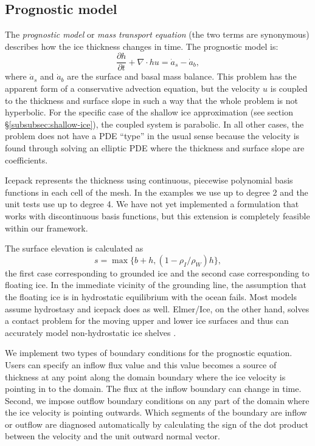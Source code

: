 \documentclass[journal abbreviation, manuscript]{copernicus}
\begin{document}
\subsection{Prognostic model}

The \emph{prognostic model} or \emph{mass transport equation} (the two terms are synonymous) describes how the ice thickness changes in time.
The prognostic model is:
\begin{equation}
    \frac{\partial h}{\partial t} + \nabla\cdot hu = \dot a_s - \dot a_b,
    \label{eq:prognostic-eqn}
\end{equation}
where $\dot a_s$ and $\dot a_b$ are the surface and basal mass balance.
This problem has the apparent form of a conservative advection equation, but the velocity $u$ is coupled to the thickness and surface slope in such a way that the whole problem is not hyperbolic.
For the specific case of the shallow ice approximation (see section \S\ref{subsubsec:shallow-ice}), the coupled system is parabolic.
In all other cases, the problem does not have a PDE ``type'' in the usual sense because the velocity is found through solving an elliptic PDE where the thickness and surface slope are coefficients.

Icepack represents the thickness using continuous, piecewise polynomial basis functions in each cell of the mesh.
In the examples we use up to degree 2 and the unit tests use up to degree 4.
We have not yet implemented a formulation that works with discontinuous basis functions, but this extension is completely feasible within our framework.

The surface elevation is calculated as
\begin{equation}
    s = \max\{b + h, (1 - \rho_I / \rho_W)h\},
\end{equation}
the first case corresponding to grounded ice and the second case corresponding to floating ice.
In the immediate vicinity of the grounding line, the assumption that the floating ice is in hydrostatic equilibrium with the ocean fails.
Most models assume hydrostasy and icepack does as well.
Elmer/Ice, on the other hand, solves a contact problem for the moving upper and lower ice surfaces and thus can accurately model non-hydrostatic ice shelves \citep{gagliardini2013capabilities}.

We implement two types of boundary conditions for the prognostic equation.
Users can specify an inflow flux value and this value becomes a source of thickness at any point along the domain boundary where the ice velocity is pointing in to the domain.
The flux at the inflow boundary can change in time.
Second, we impose outflow boundary conditions on any part of the domain where the ice velocity is pointing outwards.
Which segments of the boundary are inflow or outflow are diagnosed automatically by calculating the sign of the dot product between the velocity and the unit outward normal vector.
\end{document}

